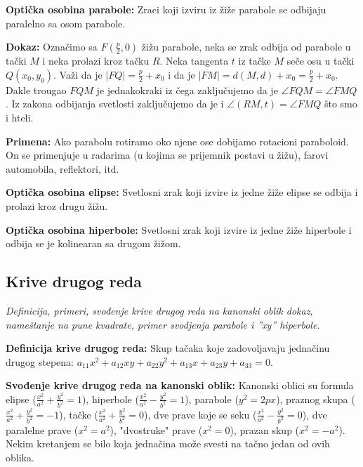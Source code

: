 \documentclass[12pt]{article}
\begin{document}
\textbf{Optička osobina parabole:} Zraci koji izviru iz žiže parabole se
odbijaju paralelno sa osom parabole.
\par

\textbf{Dokaz:} Označimo sa $F(\frac{p}{2},0)$ žižu parabole, neka se zrak
odbija od parabole u tački $M$ i neka prolazi kroz tačku $R$. Neka tangenta $t$
iz tačke $M$ seče osu u tački $Q(x_0,y_0)$. Važi da je $|FQ|=\frac{p}{2}+x_0$ i
da je $|FM|=d(M,d)+x_0=\frac{p}{2}+x_0$. Dakle trougao $FQM$ je jednakokraki
iz čega zaključujemo da je $\angle FQM=\angle FMQ$. Iz zakona odbijanja
svetlosti zaključujemo da je i $\angle(RM,t)=\angle FMQ$ što smo i hteli.
\par

\textbf{Primena:} Ako parabolu rotiramo oko njene ose dobijamo rotacioni
paraboloid. On se primenjuje u radarima (u kojima se prijemnik postavi u žižu),
farovi automobila, reflektori, itd.
\par

\textbf{Optička osobina elipse:} Svetlosni zrak koji izvire iz jedne žiže
elipse se odbija i prolazi kroz drugu žižu.
\par

\textbf{Optička osobina hiperbole:} Svetlosni zrak koji izvire iz jedne žiže
hiperbole i odbija se je kolinearan sa drugom žižom.

\subsection{Krive drugog reda}
\textit{Definicija, primeri, svođenje krive drugog reda na kanonski oblik
    dokaz, nameštanje na pune kvadrate, primer svodjenja parabole i ”xy”
    hiperbole.}
\par
\vspace*{1cm}

\textbf{Definicija krive drugog reda:} Skup tačaka koje zadovoljavaju jednačinu
drugog stepena: $a_{11}x^2+a_{12}xy+a_{22}y^2+a_{13}x+a_{23}y+a_{33}=0$.
\par

\textbf{Svođenje krive drugog reda na kanonski oblik:} Kanonski oblici su
formula elipse ($\frac{x^2}{a^2}+\frac{y^2}{b^2}=1$), hiperbole
($\frac{x^2}{a^2}-\frac{y^2}{b^2}=1$), parabole ($y^2=2px$), praznog skupa
($\frac{x^2}{a^2}+\frac{y^2}{b^2}=-1$), tačke
($\frac{x^2}{a^2}+\frac{y^2}{b^2}=0$), dve prave koje se seku
($\frac{x^2}{a^2}-\frac{y^2}{b^2}=0$), dve paralelne prave ($x^2=a^2$),
"dvostruke" prave ($x^2=0$), prazan skup ($x^2=-a^2$). Nekim kretanjem se
bilo koja jednačina može svesti na tačno jedan od ovih oblika.
\par
\end{document}
